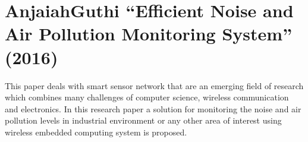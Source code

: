 



\section{AnjaiahGuthi “Efficient Noise and Air Pollution Monitoring System” (2016)}
This paper deals with smart sensor network that are an emerging field of research which combines many challenges of computer science, wireless communication and electronics. In this research paper a solution for monitoring the noise and air pollution levels in industrial environment or any other area of interest using wireless embedded computing system is proposed.


